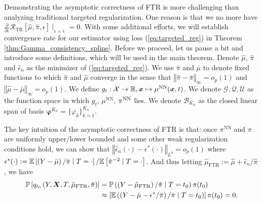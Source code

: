 Demonstrating the asymptotic correctness of FTR is more challenging than analyzing traditional targeted regularization. One reason is that we no more have  $\frac{\partial}{\partial\epsilon}\mathcal{R}_{\text{TR}}[\hat{\mu},\hat{\pi},{\epsilon}]\mid_{\epsilon=\hat\epsilon}=0$. With some additional efforts, we will establish convergence rate for our estimator using loss (\ref{eq:targeted_reg}) in Theorem \ref{thm:Gamma_consistency_spline}.
Before we proceed, let us pause a bit and introduce some definitions, which will be used in the main theorem. Denote $\hat{\mu}$, $\hat{\pi}$ and $\hat{\epsilon}_n$ as the minimizer of (\ref{eq:targeted_reg}). We use $\bar\pi$ and $\bar \mu$ to denote fixed functions to which $\hat\pi$ and $\hat \mu$ converge in the sense that $\left\Vert \hat{\pi}-\bar{\pi}\right\Vert _{\infty}=o_p(1)$ and $\left\Vert \hat{\mu}-\bar{\mu}\right\Vert _{\infty}=o_p(1)$. We define $g_{t}:\mathcal{X}\to\mathbb{R},\boldsymbol{x}\mapsto\mu^{\text{NN}}(\boldsymbol{x},t)$. We denote $\mathcal{G},\mathcal{Q}, \mathcal{U}$ as the function space in which $g_t$, $\mu^{\text{NN}}$, $\pi^{\text{NN}}$ lies. We denote $\mathcal{B}_{K_n}$ as the closed linear span of basis $\bm\varphi^{K_n}=\{\varphi_k\}_{k=1}^{K_n}$. 

The key intuition of the asymptotic correctness of FTR is that: once $\pi^{\text{NN}}$ and $\pi$ are uniformly upper/lower bounded
and some other weak regularization conditions hold, we can show that $\left\Vert \hat{\epsilon}_{n}(\cdot)-\epsilon^{*}(\cdot)\right\Vert _{L^2}=o_{p}(1)$ where $\epsilon^{*}(\cdot):=\mathbb{E}\left[\left(Y-\bar{\mu}\right)/\bar{\pi}\mid T=\cdot\right]/\mathbb{E}\left[\bar{\pi}^{-2}\mid T=\cdot\right]$. And thus letting $\hat{\mu}_{\text{FTR}}:=\hat{\mu}+\hat{\epsilon}_{n}/\hat{\pi}$,
we have
\begin{align*}
\mathbb{P}\left[q_{t_{0}}\left(Y,\boldsymbol{X},T,\hat{\mu}_{\text{FTR}},\hat{\pi}\right)\right] & =\mathbb{P}\left(\left(Y-\hat{\mu}_{\text{FTR}}\right)/\hat{\pi}\mid T=t_{0}\right)\pi(t_{0})\\
 & \approx\left[\mathbb{E}\left(\left(Y-\bar{\mu}-\epsilon^{*}/\bar{\pi}\right)/\bar{\pi}\mid T=t_{0}\right)\right]\pi(t_{0}) = 0.
\end{align*}


